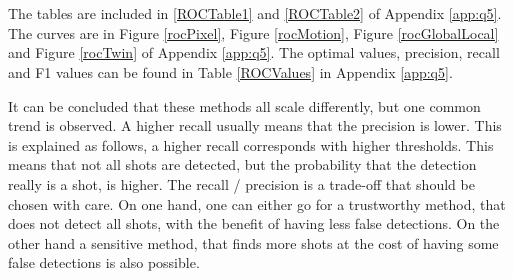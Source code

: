 \section[A summarizing ROC curve for each video sequence, illustrating the effectiveness of the different techniques implemented (see slide 26 of the introductory lecture). Corresponding tables need to be provided as well, containing the optimal parameter settings and the resulting precision, recall, and F1 score (the harmonic mean of precision and recall).]{}

The tables are included in \ref{ROCTable1} and \ref{ROCTable2} of Appendix \ref{app:q5}. The curves are in Figure \ref{rocPixel}, Figure \ref{rocMotion}, Figure \ref{rocGlobalLocal} and Figure \ref{rocTwin} of Appendix \ref{app:q5}. The optimal values, precision, recall and F1 values can be found in Table \ref{ROCValues} in Appendix \ref{app:q5}. 

It can be concluded that these methods all scale differently, but one common trend is observed. A higher recall usually means that the precision is lower. This is explained as follows, a higher recall corresponds with higher thresholds. This means that not all shots are detected, but the probability that the detection really is a shot, is higher. The recall / precision is a trade-off that should be chosen with care. On one hand, one can either go for a trustworthy method, that does not detect all shots, with the benefit of having less false detections. On the other hand a sensitive method, that finds more shots at the cost of having some false detections is also possible.
\\
